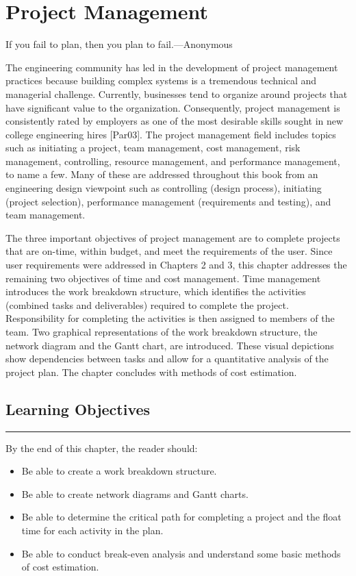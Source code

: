 \chapter{ Project Management}
\label{chapter:projectManagement}
\graphicspath{ {./chapter10/Fig} }

\begin{itquote}
If you fail to plan, then you plan to fail.---Anonymous
\end{itquote}

The engineering community has led in the development of project
management practices because building complex systems is a tremendous
technical and managerial challenge. Currently, businesses tend to
organize around projects that have significant value to the
organization. Consequently, project management is consistently rated by
employers as one of the most desirable skills sought in new college
engineering hires {[}Par03{]}. The project management field includes
topics such as initiating a project, team management, cost management,
risk management, controlling, resource management, and performance
management, to name a few. Many of these are addressed throughout this
book from an engineering design viewpoint such as controlling (design
process), initiating (project selection), performance management
(requirements and testing), and team management.

The three important objectives of project management are to complete
projects that are on-time, within budget, and meet the requirements of
the user. Since user requirements were addressed in Chapters 2 and 3,
this chapter addresses the remaining two objectives of time and cost
management. Time management introduces the work breakdown structure,
which identifies the activities (combined tasks and deliverables)
required to complete the project. Responsibility for completing the
activities is then assigned to members of the team. Two graphical
representations of the work breakdown structure, the network diagram and
the Gantt chart, are introduced. These visual depictions show
dependencies between tasks and allow for a quantitative analysis of the
project plan. The chapter concludes with methods of cost estimation.

\section*{Learning Objectives}
\noindent\rule{\linewidth}{1pt}
By the end of this chapter, the reader should:

\begin{itemize}
\item
  Be able to create a work breakdown structure.
\item
  Be able to create network diagrams and Gantt charts.
\item
  Be able to determine the critical path for completing a project and
  the float time for each activity in the plan.
\item
  Be able to conduct break-even analysis and understand some basic
  methods of cost estimation.
\end{itemize}

